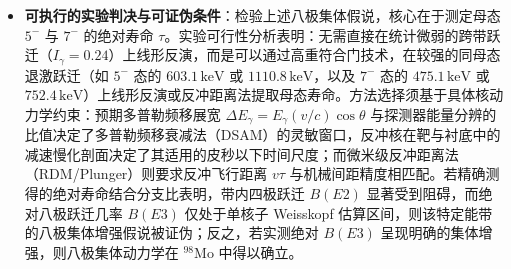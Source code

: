 \begin{itemize}
\item \textbf{可执行的实验判决与可证伪条件}：检验上述八极集体假说，核心在于测定母态 $5^-$ 与 $7^-$ 的绝对寿命 $\tau$。实验可行性分析表明：无需直接在统计微弱的跨带跃迁（$I_\gamma = 0.24$）上线形反演，而是可以通过高重符合门技术，在较强的同母态退激跃迁（如 $5^-$ 态的 $603.1\,\mathrm{keV}$ 或 $1110.8\,\mathrm{keV}$，以及 $7^-$ 态的 $475.1\,\mathrm{keV}$ 或 $752.4\,\mathrm{keV}$）上线形反演或反冲距离法提取母态寿命。方法选择须基于具体核动力学约束：预期多普勒频移展宽 $\Delta E_\gamma = E_\gamma (v/c) \cos\theta$ 与探测器能量分辨的比值决定了多普勒频移衰减法（DSAM）的灵敏窗口，反冲核在靶与衬底中的减速慢化剖面决定了其适用的皮秒以下时间尺度；而微米级反冲距离法（RDM/Plunger）则要求反冲飞行距离 $v\tau$ 与机械间距精度相匹配。若精确测得的绝对寿命结合分支比表明，带内四极跃迁 $B(E2)$ 显著受到阻碍，而绝对八极跃迁几率 $B(E3)$ 仅处于单核子 Weisskopf 估算区间，则该特定能带的八极集体增强假说被证伪；反之，若实测绝对 $B(E3)$ 呈现明确的集体增强，则八极集体动力学在 $^{98}\mathrm{Mo}$ 中得以确立。
\end{itemize}

